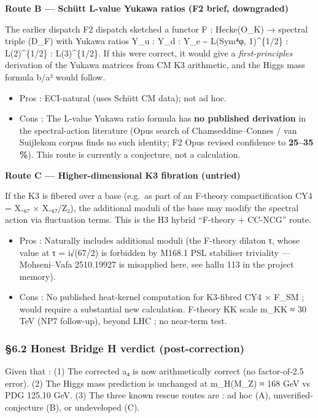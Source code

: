 \documentclass[
  11pt,
  a4paper,
]{article}
\providecommand{\tightlist}{\setlength{\itemsep}{0pt}\setlength{\parskip}{0pt}}
\providecommand{\tightlist}{%
  \setlength{\itemsep}{0pt}\setlength{\parskip}{0pt}}
\begin{document}
\textbf{Route B --- Schütt L-value Yukawa ratios (F2 brief, downgraded)}

The earlier dispatch F2 dispatch sketched a functor F : Hecke(O\_K) → spectral triple (D\_F) with Yukawa ratios Y\_u : Y\_d : Y\_e \textasciitilde{} L(Sym⁴φ, 1)\^{}\{1/2\} : L(2)\^{}\{1/2\} : L(3)\^{}\{1/2\}. If this were correct, it would give a \emph{first-principles} derivation of the Yukawa matrices from CM K3 arithmetic, and the Higgs mass formula b/a² would follow.

\begin{itemize}
\tightlist
\item
  Pros : ECI-natural (uses Schütt CM data); not ad hoc.
\item
  Cons : The L-value Yukawa ratio formula has \textbf{no published derivation} in the spectral-action literature (Opus search of Chamseddine--Connes / van Suijlekom corpus finds no such identity; F2 Opus revised confidence to \textbf{25--35 \%}). This route is currently a conjecture, not a calculation.
\end{itemize}

\textbf{Route C --- Higher-dimensional K3 fibration (untried)}

If the K3 is fibered over a base (e.g.~as part of an F-theory compactification CY4 = X₋₆₇ × X₋₆₇/Z₂), the additional moduli of the base may modify the spectral action via fluctuation terms. This is the H3 hybrid ``F-theory + CC-NCG'' route.

\begin{itemize}
\tightlist
\item
  Pros : Naturally includes additional moduli (the F-theory dilaton τ, whose value at τ = i√(67/2) is forbidden by M168.1 PSL stabiliser triviality --- Mohseni--Vafa 2510.19927 is misapplied here, see hallu 113 in the project memory).
\item
  Cons : No published heat-kernel computation for K3-fibred CY4 × F\_SM ; would require a substantial new calculation. F-theory KK scale m\_KK ≈ 30 TeV (NP7 follow-up), beyond LHC ; no near-term test.
\end{itemize}

\hypertarget{honest-bridge-h-verdict-post-correction}{%
\subsubsection{§6.2 Honest Bridge H verdict (post-correction)}\label{honest-bridge-h-verdict-post-correction}}

Given that :
(1) The corrected a₄ is now arithmetically correct (no factor-of-2.5 error).
(2) The Higgs mass prediction is unchanged at m\_H(M\_Z) ≈ 168 GeV vs PDG 125.10 GeV.
(3) The three known rescue routes are : ad hoc (A), unverified-conjecture (B), or undeveloped (C).
\end{document}
